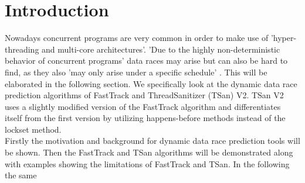 \documentclass[12pt]{article}
\begin{document}
	\section{Introduction}\label{intro}
	Nowadays concurrent programs are very common in order to make use of 'hyper-threading and multi-core architectures'\cite[p. 14]{SWB-0643851}. 'Due to the highly non-deterministic behavior of concurrent programs' \cite[p. 1]{sulzmann} data races may arise but can also be hard to find, as they also 'may only arise under a specific schedule' \cite[p. 1]{sulzmann}. This will be elaborated in the following section. We specifically look at the dynamic data race prediction algorithms of FastTrack and ThreadSanitizer (TSan) V2. TSan V2 uses a slightly modified version of the FastTrack algorithm and differentiates itself from the first version by utilizing happens-before methods instead of the lockset method.\\
	Firstly the motivation and background for dynamic data race prediction tools will be shown. Then the FastTrack and TSan algorithms will be demonstrated along with examples showing the limitations of FastTrack and TSan. In the following the same
\end{document}
